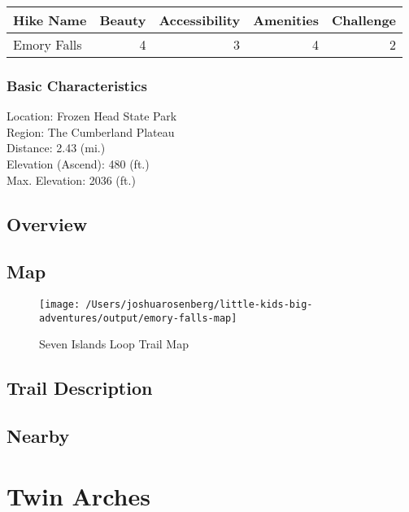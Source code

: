 \documentclass[
]{book}
\begin{document}
\begin{tabular}{l|r|r|r|r}
\hline
Hike Name & Beauty & Accessibility & Amenities & Challenge\\
\hline
Emory Falls & 4 & 3 & 4 & 2\\
\hline
\end{tabular}

\hypertarget{basic-characteristics-8}{%
\subsection{Basic Characteristics}\label{basic-characteristics-8}}

Location: Frozen Head State Park\\
Region: The Cumberland Plateau\\
Distance: 2.43 (mi.)\\
Elevation (Ascend): 480 (ft.)\\
Max. Elevation: 2036 (ft.)

\hypertarget{overview-8}{%
\section{Overview}\label{overview-8}}

\hypertarget{map-8}{%
\section{Map}\label{map-8}}

\begin{figure}
\texttt{[image: /Users/joshuarosenberg/little-kids-big-adventures/output/emory-falls-map]} \caption{Seven Islands Loop Trail Map}\label{fig:unnamed-chunk-25}
\end{figure}

\hypertarget{trail-description-8}{%
\section{Trail Description}\label{trail-description-8}}

\hypertarget{nearby-8}{%
\section{Nearby}\label{nearby-8}}

\hypertarget{twin-arches}{%
\chapter{Twin Arches}\label{twin-arches}}
\end{document}
